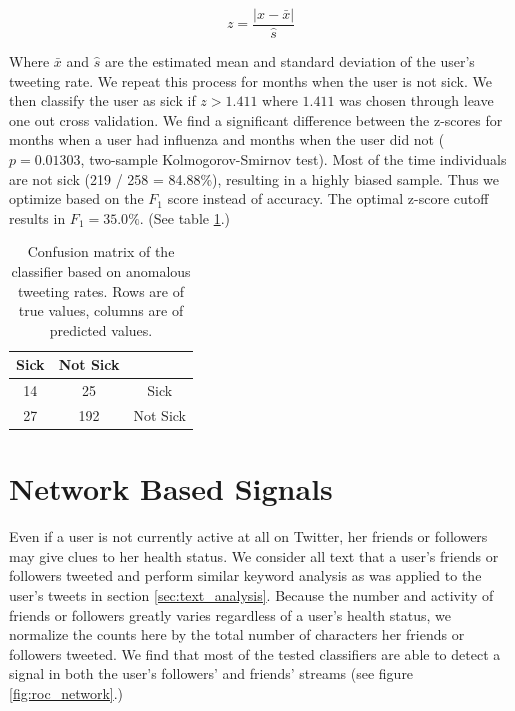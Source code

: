 \documentclass{acm_proc_article-sp}
\begin{document}
\begin{equation}
z = \frac{|x - \bar{x}|}{\hat{s}}
\end{equation}

Where \(\bar{x}\) and \(\hat{s}\) are the estimated mean and standard deviation of the user's tweeting rate. \cite{Grubs:1969ab} We repeat this process for months when the user is not sick. We then classify the user as sick if \(z > 1.411\) where \(1.411\) was chosen through leave one out cross validation. We find a significant difference between the z-scores for months when a user had influenza and months when the user did not (\(p = 0.01303\), two-sample Kolmogorov-Smirnov test). Most of the time individuals are not sick (219 / 258 = 84.88\%), resulting in a highly biased sample. Thus we optimize based on the \(F_1\) score instead of accuracy. The optimal z-score cutoff results in \(F_1= 35.0\%\). (See table \ref{tab:tweet_anomaly_confusion}.) 


\begin{table}
\centering
\begin{tabular}{|c|c|c|} \hline
Sick&Not Sick&\ \\ \hline
14 & 25 & Sick\\ \hline
27 & 192 & Not Sick\\
\hline\end{tabular}
\caption{Confusion matrix of the classifier based on anomalous tweeting rates. Rows are of true values, columns are of predicted values.}
\label{tab:tweet_anomaly_confusion}
\end{table}

\section{Network Based Signals}

Even if a user is not currently active at all on Twitter, her friends or followers may give clues to her health status. We consider all text that a user's friends or followers tweeted and perform similar keyword analysis as was applied to the user's tweets in section \ref{sec:text_analysis}. Because the number and activity of friends or followers greatly varies regardless of a user's health status, we normalize the counts here by the total number of characters her friends or followers tweeted. We find that most of the tested classifiers are able to detect a signal in both the user's followers' and friends' streams (see figure \ref{fig:roc_network}.)
\end{document}
